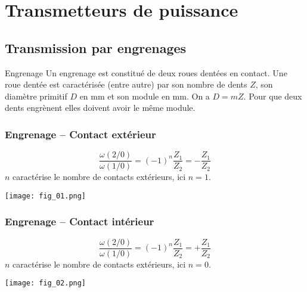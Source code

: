\setchapterpreamble[u]{\margintoc}

\chapter{Transmetteurs de puissance}

\marginnote[8cm]{
}


\section{Transmission par engrenages}
\begin{defi}{Engrenage}
Un engrenage est constitué de deux roues dentées en contact. Une roue dentée est caractérisée (entre autre) par son nombre de dents $Z$, son diamètre primitif $D$ en \si{mm} et son module en \si{mm}. On a $D=mZ$.
Pour que deux dents engrènent elles doivent avoir le même module.
\end{defi}

\subsection{Engrenage -- Contact extérieur}
\begin{table*}[!h]
\begin{minipage}[c]{.4\linewidth}
\begin{resultat}
$$
\dfrac{\omega(2/0)}{\omega(1/0)}= (-1)^n \dfrac{Z_1}{Z_2}=-\dfrac{Z_1}{Z_2}
$$
$n$ caractérise le nombre de contacts extérieurs, ici $n=1$.
\end{resultat}
\end{minipage}\hfill
\begin{minipage}[c]{.6\linewidth}
\begin{center}
\texttt{[image: fig\_01.png]}
\end{center}
\end{minipage}
\end{table*}

\subsection{Engrenage -- Contact intérieur}
\begin{table*}[!h]
\begin{minipage}[c]{.4\linewidth}
\begin{resultat}
$$
\dfrac{\omega(2/0)}{\omega(1/0)}= (-1)^n \dfrac{Z_1}{Z_2}=+\dfrac{Z_1}{Z_2}
$$
$n$ caractérise le nombre de contacts extérieurs, ici $n=0$.
\end{resultat}
\end{minipage}\hfill
\begin{minipage}[c]{.6\linewidth}
\begin{center}
\texttt{[image: fig\_02.png]}
\end{center}
\end{minipage}
\end{table*}

